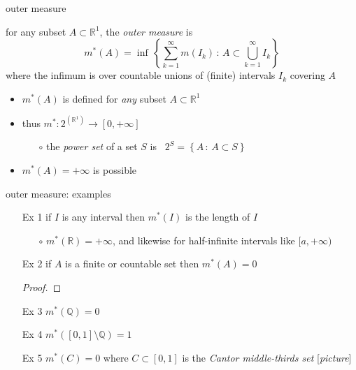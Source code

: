 \documentclass[10pt,
               svgnames,
               hyperref={colorlinks,
                         citecolor=DeepPink4,
                         linkcolor=FireBrick,
                         urlcolor=blue},
               usepdftitle=false]{beamer}
\newcommand{\QQ}{\mathbb{Q}}
\newcommand{\RR}{\mathbb{R}}
\begin{document}
\begin{frame}{outer measure}

\begin{definition}
for any subset $A\subset \RR^1$, the \emph{outer measure} is
	$$m^*(A) = \inf\, \left\{\sum_{k=1}^\infty m(I_k)\,:\,A \subset \bigcup_{k=1}^\infty I_k\right\}$$
where the infimum is over countable unions of (finite) intervals $I_k$ covering $A$
\end{definition}

\begin{itemize}
\item $m^*(A)$ is defined for \emph{any} subset $A\subset \RR^1$
\item thus $m^* : 2^{(\RR^1)} \to [0,+\infty]$
   \begin{itemize}
   \item[$\circ$] the \emph{power set} of a set $S$ is \, $2^S = \left\{A \,:\, A\subset S\right\}$
   \end{itemize}
\item $m^*(A)=+\infty$ is possible
\end{itemize}
\end{frame}


\begin{frame}{outer measure: examples}
\begin{itemize}
\item[Ex 1] if $I$ is any interval then $m^*(I)$ is the length of $I$
   \begin{itemize}
   \item[$\circ$] $m^*(\RR)=+\infty$, and likewise for half-infinite intervals like $[a,+\infty)$
   \end{itemize}
\item[Ex 2] if $A$ is a finite or countable set then $m^*(A)=0$

\begin{proof}
\phantom{x}

\vspace{15mm}
\end{proof}
\item[Ex 3] $m^*(\QQ)=0$
\item[Ex 4] $m^*([0,1]\setminus\QQ)=1$
\item[Ex 5] $m^*(C)=0$ where $C \subset [0,1]$ is the \emph{Cantor middle-thirds set}  \hfill [\emph{picture}]

\vspace{14mm}
\end{itemize}
\end{frame}
\end{document}
